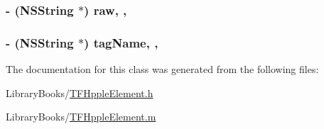 \subsubsection[{raw}]{\setlength{\rightskip}{0pt plus 5cm}-\/ (N\+S\+String $\ast$) raw\hspace{0.3cm}{\ttfamily [read]}, {\ttfamily [nonatomic]}, {\ttfamily [copy]}}\label{interface_t_f_hpple_element_a67a2f29f7e31c69d23e2365f7602241a}
\hypertarget{interface_t_f_hpple_element_a25cfdaa376701dc9817c1b2c7e135b75}{}
\subsubsection[{tag\+Name}]{\setlength{\rightskip}{0pt plus 5cm}-\/ (N\+S\+String $\ast$) tag\+Name\hspace{0.3cm}{\ttfamily [read]}, {\ttfamily [nonatomic]}, {\ttfamily [copy]}}\label{interface_t_f_hpple_element_a25cfdaa376701dc9817c1b2c7e135b75}


The documentation for this class was generated from the following files\+:\begin{DoxyCompactItemize}
\item 
Library\+Books/\hyperlink{_t_f_hpple_element_8h}{T\+F\+Hpple\+Element.\+h}\item 
Library\+Books/\hyperlink{_t_f_hpple_element_8m}{T\+F\+Hpple\+Element.\+m}\end{DoxyCompactItemize}
